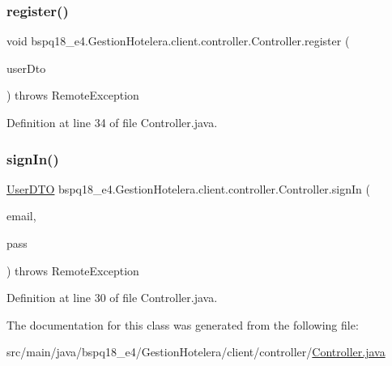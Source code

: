 \subsubsection{\texorpdfstring{register()}{register()}}
{\footnotesize\ttfamily void bspq18\+\_\+e4.\+Gestion\+Hotelera.\+client.\+controller.\+Controller.\+register (\begin{DoxyParamCaption}\item[{\mbox{\hyperlink{classbspq18__e4_1_1_gestion_hotelera_1_1server_1_1dto_1_1_user_d_t_o}{User\+D\+TO}}}]{user\+Dto }\end{DoxyParamCaption}) throws Remote\+Exception}



Definition at line 34 of file Controller.\+java.

\mbox{\label{classbspq18__e4_1_1_gestion_hotelera_1_1client_1_1controller_1_1_controller_ae3c7ed62d01b30d877beec1c195f4c85}} 
\subsubsection{\texorpdfstring{sign\+In()}{signIn()}}
{\footnotesize\ttfamily \mbox{\hyperlink{classbspq18__e4_1_1_gestion_hotelera_1_1server_1_1dto_1_1_user_d_t_o}{User\+D\+TO}} bspq18\+\_\+e4.\+Gestion\+Hotelera.\+client.\+controller.\+Controller.\+sign\+In (\begin{DoxyParamCaption}\item[{String}]{email,  }\item[{String}]{pass }\end{DoxyParamCaption}) throws Remote\+Exception}



Definition at line 30 of file Controller.\+java.



The documentation for this class was generated from the following file\+:\begin{DoxyCompactItemize}
\item 
src/main/java/bspq18\+\_\+e4/\+Gestion\+Hotelera/client/controller/\mbox{\hyperlink{_controller_8java}{Controller.\+java}}\end{DoxyCompactItemize}
